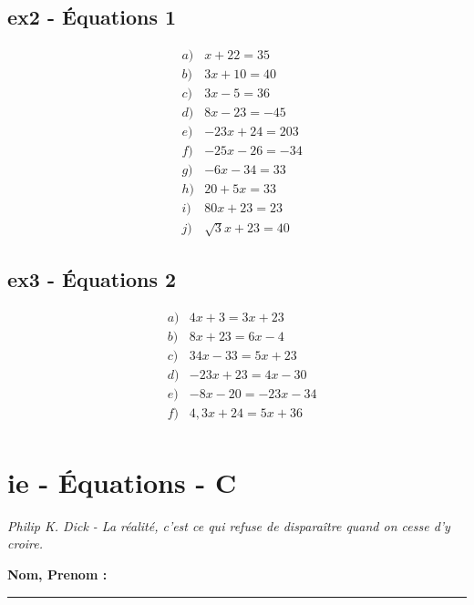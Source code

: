\documentclass[12pt]{article}
\newcommand{\horrule}[1]{\rule{\linewidth}{#1}} %
\begin{document}
  \begin{multicols}{2}
    \subsection*{ex2 - Équations 1}

    \begin{eqnarray*}
      & a) & x + 22 = 35  \\
      & b) & 3x + 10 = 40  \\
      & c) & 3x - 5  = 36  \\
      & d) & 8x - 23 = -45 \\
      & e) & -23x + 24 = 203 \\
      & f) & -25x - 26 = -34 \\
      & g) & -6x - 34 = 33  \\
      & h) & 20 + 5x = 33  \\
      & i) & 80x + 23 = 23 \\
      & j) & \sqrt{3} x + 23 = 40 
    \end{eqnarray*}


    \subsection*{ex3 - Équations 2}

    \begin{eqnarray*}
      & a) & 4x + 3 = 3x + 23    \\
      & b) & 8x + 23 = 6x - 4     \\
      & c) & 34x - 33 = 5x + 23    \\
      & d) & -23x + 23 = 4x -30     \\
      & e) & -8x - 20 = -23x - 34  \\
      & f) & 4,3x + 24 = 5x + 36    \\
    \end{eqnarray*}
  \end{multicols}

  \newpage

  \section*{ie - Équations - C}
\begin{center}
  \textit{Philip K. Dick - La réalité, c'est ce qui refuse de disparaître quand on cesse d'y croire.}
\end{center}
\textbf{Nom, Prenom :}\\
\horrule{2px}
\end{document}
